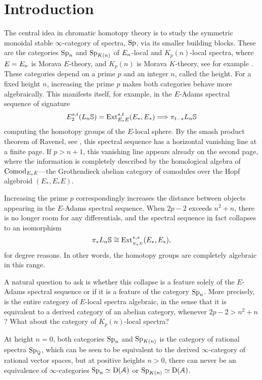 

\section{Introduction}
\label{ch2:sec:introduction}

The central idea in chromatic homotopy theory is to study the symmetric monoidal stable $\infty$-category of spectra, $\mathrm{Sp}$, via its smaller building blocks. These are the categories $\mathrm{Sp}_{n}$ and $\mathrm{Sp}_{K(n)}$ of $E_{n}$-local and $K_p(n)$-local spectra, where $E=E_{n}$ is Morava $E$-theory, and $K_p(n)$ is Morava $K$-theory, see for example \cite{hovey-strickland_99}. These categories depend on a prime $p$ and an integer $n$, called the height. For a fixed height $n$, increasing the prime $p$ makes both categories behave more algebraically. This manifests itself, for example, in the $E$-Adams spectral sequence of signature
$$E^{s,t}_2 (L_n\mathbb{S}) = \operatorname{Ext}_{E_*E}^{s,t}(E_*,E_*)\Longrightarrow \pi_{t-s} L_n\mathbb{S}$$
computing the homotopy groups of the $E$-local sphere. By the smash product theorem of Ravenel, see \cite[7.5.6]{ravenel_92}, this spectral sequence has a horizontal vanishing line at a finite page. If $p>n+1$, this vanishing line appears already on the second page, where the information is completely described by the homological algebra of $\mathrm{Comod}_{E_*E}$---the Grothendieck abelian category of comodules over the Hopf algebroid $(E_*, E_*E)$. 

Increasing the prime $p$ correspondingly increases the distance between objects appearing in the $E$-Adams spectral sequence. When $2p-2$ exceeds $n^2+n$, there is no longer room for any differentials, and the  spectral sequence in fact collapses to an isomorphism
$$\pi_* L_n\mathbb{S}\cong \operatorname{Ext}^{*,*}_{_{E_*E}}(E_*, E_*),$$
for degree reasons. In other words, the homotopy groups are completely algebraic in this range. 

A natural question to ask is whether this collapse is a feature solely of the $E$-Adams spectral sequence or if it is a feature of the category $\mathrm{Sp}_{n}$. More precisely, is the entire category of $E$-local spectra algebraic, in the sense that it is equivalent to a derived category of an abelian category, whenever $2p-2>n^2+n$? What about the category of $K_p(n)$-local spectra?

At height $n=0$, both categories $\mathrm{Sp}_{n}$ and $\mathrm{Sp}_{K(n)}$ is the category of rational spectra $\mathrm{Sp}_{\mathbb{Q}}$, which can be seen to be equivalent to the derived $\infty$-category of rational vector spaces, but at positive heights $n>0$, there can never be an equivalence of $\infty$-categories $\mathrm{Sp}_{n} \simeq \mathrm{D}(\EuScript{A})$ or $\mathrm{Sp}_{K(n)} \simeq \mathrm{D}(\EuScript{A})$. 

